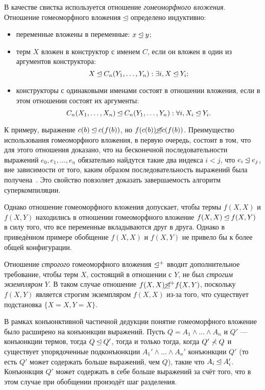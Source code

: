 В качестве свистка используется отношение \emph{гомеоморфного вложения}.\cite{scGen}
Отношение гомеоморфного вложения $\unlhd$ определено индуктивно:
\begin{itemize}
\item переменные вложены в переменные: $x \unlhd y$;
\item терм $X$ вложен в конструктор с именем $C$, если он вложен в один из аргументов конструктора:
      $$X \unlhd C_n(Y_1, \dots, Y_n): \exists i, X \unlhd Y_i;$$
\item конструкторы с одинаковыми именами состоят в отношении вложения, если в этом отношении
      состоят их аргументы:
      $$C_n(X_1, \dots, X_n) \unlhd C_n(Y_1, \dots, Y_n): \forall i, X_i \unlhd Y_i.$$
\end{itemize}

К примеру, выражение $c(b) \unlhd c(f(b))$, но $f(c(b)) \cancel{\unlhd} c(f(b))$.
Преимущество использования гомеоморфного вложения, в первую очередь, состоит в том,
что для этого отношения доказано, что на бесконечной последовательности выражений $e_0, e_1, \dots, e_n$
обязательно найдутся такие два индекса $i < j$, что $e_i \unlhd e_j$, вне зависимости
от того, каким образом последовательность выражений была получена~\cite{scPos}.
Это свойство повзоляет доказать завершаемость алгоритм суперкомпиляции.

Однако отношение гомеоморфного вложения допускает, чтобы термы $f(X, X)$ и $f(X, Y)$
находились в отношении гомеоморфного вложение $f(X, X) \unlhd f(X, Y)$ в силу того,
что все переменные вкладываются друг в друга. Однако в приведённом примере обобщение
$f(X, X)$ и $f(X, Y)$ не привело бы к более общей конфигурации.

Отношение \emph{строгого} гомеоморфного вложения $\unlhd^+$ вводит дополнительное
требование, чтобы терм $X$, состоящий в отношении с $Y$, не был \emph{строгим экземпляром} $Y$\cite{homeo}.
В таком случае отношение $f(X, X) \cancel{\unlhd}^+ f(X, Y)$, поскольку $f(X, Y)$ является строгим
экземпляром $f(X, X)$ из-за того, что существует подстановка $\{ X = X, Y = X \}$.

В рамках конъюнктивной частичной дедукции понятие гомеоморфного вложение было расширено на конъюнкции выражений.
Пусть $Q = A_1 \land \dots \land A_n$ и $Q'$ --- конъюнкции термов, тогда $Q \unlhd Q'$, тогда и только тогда,
когда $Q' \not\prec Q$ и существует упорядоченные подконъюнкции $A_1' \land \dots \land A_n'$
конъюнкции $Q'$ (то есть $Q'$ может содержать больше выражений, чем $Q$), такие что $A_i \unlhd A_i'$.
Конъюнкция $Q'$ может содержать в себе больше выражений за счёт того, что в этом случае при обобщении
произодёт шаг разделения.
